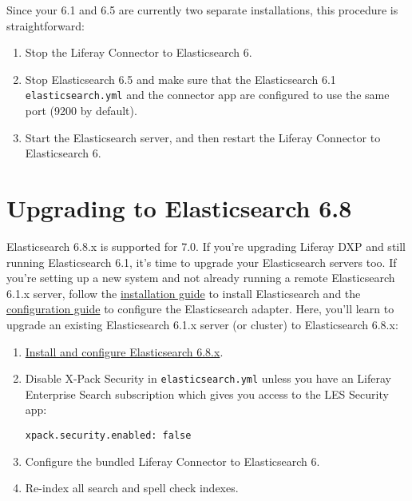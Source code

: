 Since your 6.1 and 6.5 are currently two separate installations, this
procedure is straightforward:

\begin{enumerate}
\def\labelenumi{\arabic{enumi}.}
\item
  Stop the Liferay Connector to Elasticsearch 6.
\item
  Stop Elasticsearch 6.5 and make sure that the Elasticsearch 6.1
  \texttt{elasticsearch.yml} and the connector app are configured to use
  the same port (9200 by default).
\item
  Start the Elasticsearch server, and then restart the Liferay Connector
  to Elasticsearch 6.
\end{enumerate}

\chapter{Upgrading to Elasticsearch
6.8}\label{upgrading-to-elasticsearch-6.8}

Elasticsearch 6.8.x is supported for 7.0. If you're upgrading Liferay
DXP and still running Elasticsearch 6.1, it's time to upgrade your
Elasticsearch servers too. If you're setting up a new system and not
already running a remote Elasticsearch 6.1.x server, follow the
\href{/docs/7-2/deploy/-/knowledge_base/d/installing-elasticsearch}{installation
guide} to install Elasticsearch and the
\href{/docs/7-2/deploy/-/knowledge_base/d/configuring-the-liferay-elasticsearch-connector}{configuration
guide} to configure the Elasticsearch adapter. Here, you'll learn to
upgrade an existing Elasticsearch 6.1.x server (or cluster) to
Elasticsearch 6.8.x:

\begin{enumerate}
\def\labelenumi{\arabic{enumi}.}
\item
  \href{/docs/7-2/deploy/-/knowledge_base/d/elasticsearch}{Install and
  configure Elasticsearch 6.8.x}.
\item
  Disable X-Pack Security in \texttt{elasticsearch.yml} unless you have
  an Liferay Enterprise Search subscription which gives you access to
  the LES Security app:

\begin{verbatim}
xpack.security.enabled: false
\end{verbatim}
\item
  Configure the bundled Liferay Connector to Elasticsearch 6.
\item
  Re-index all search and spell check indexes.
\end{enumerate}

